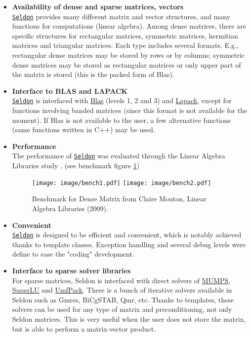 \documentclass{tufte-book}
\begin{document}
\begin{itemize}
\begin{itemize}
\item \textbf{Availability of dense and sparse matrices, vectors}\\
 \href{http://seldon.sourceforge.net/}{\tt \-Seldon} provides many different matrix and vector structures, and many functions for computations (linear algebra).
 Among dense matrices, there are specific structures for rectangular matrices, symmetric matrices, hermitian matrices and triangular matrices. Each type includes several formats. E.g., rectangular dense matrices may be stored by rows or by columns; symmetric dense matrices may be stored as rectangular matrices or only upper part of the matrix is stored (this is the packed form of Blas).
\item \textbf{Interface to BLAS and LAPACK}\\
\href{http://seldon.sourceforge.net/}{\tt \-Seldon} is interfaced with \href{http://www.netlib.org/blas/}{Blas} (levels 1, 2 and 3) and \href{http://www.netlib.org/lapack/}{Lapack}, except for functions involving banded matrices (since this format is not available for the moment). If Blas is not available to the user, a few alternative functions (same functions written in C++) may be used.
\item \textbf{Performance}\\
The performance of  \href{http://seldon.sourceforge.net/}{\tt \-Seldon} was evaluated through the Linear Algebra Libraries study \cite{linear_algebra}. (see benchmark figure \ref{fig:benchmark})


\begin{figure}
  \caption{Benchmark for Dense Matrix from Claire Mouton, Linear Algebra Libraries (2009).}
  \label{fig:benchmark}
  \texttt{[image: image/bench1.pdf]}
  \texttt{[image: image/bench2.pdf]}
\end{figure}





\item \textbf{Convenient}\\
\href{http://seldon.sourceforge.net/}{\tt \-Seldon} is designed to be efficient and convenient, which is notably achieved thanks to template classes. Exception handling and several debug levels were define to ease the "coding" development.

\item \textbf{Interface to sparse solver libraries}\\
For sparse matrices, Seldon is interfaced with direct solvers of \href{http://mumps.enseeiht.fr/}{MUMPS}, \href{http://crd-legacy.lbl.gov/~xiaoye/SuperLU/}{SuperLU} and \href{http://www.cise.ufl.edu/research/sparse/umfpack/}{UmfPack}. There is a bunch of iterative solvers available in Seldon such as Gmres, BiCgSTAB, Qmr, etc. Thanks to templates, these solvers can be used for any type of matrix and preconditioning, not only Seldon matrices. This is very useful when the user does not store the matrix, but is able to perform a matrix-vector product.


\end{itemize}
\end{itemize}
\end{document}
